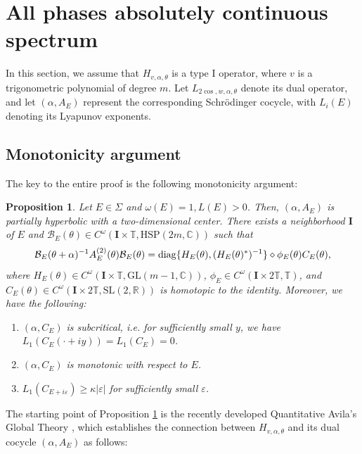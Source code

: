 \documentclass[11pt]{amsart}
\newtheorem{prop}[theorem]{Proposition}
\theoremstyle{remark}
\theoremstyle{definition}
\newcommand{\I}{{\mathbf I}}
\newcommand{\diag}{{\rm diag}}
\begin{document}
\section{All phases absolutely continuous spectrum}\label{all}
In this section, we assume that $ H_{v,\alpha,\theta} $ is a type I operator, where $ v $ is a trigonometric polynomial of degree $ m $. Let $ L_{2\cos,w,\alpha,\theta} $ denote its dual operator, and let $ (\alpha,A_E) $ represent the corresponding Schr\"odinger cocycle, with $ {L}_i(E) $ denoting its Lyapunov exponents.

\subsection{Monotonicity argument}

The key to the entire proof is the following monotonicity argument:

\begin{prop} \label{cr} Let $ E \in \Sigma $ and $ \omega(E) = 1, L(E) > 0 $. Then, $ (\alpha, A_E) $ is partially hyperbolic with a two-dimensional center. There exists a neighborhood $ \I $ of $ E $ and $ \mathcal{B}_E(\theta) \in C^\omega(\I \times \mathbb{T}, \mathrm{HSP}(2m, \mathbb{C})) $ such that \begin{equation}\label{aaa18}
\mathcal{B}_E(\theta + \alpha)^{-1} A_E^{(2)}(\theta) \mathcal{B}_E(\theta) = \diag\{H_E(\theta), (H_E(\theta)^*)^{-1}\} \diamond \phi_E(\theta) C_E(\theta),
\end{equation} where $ H_E(\theta) \in C^\omega(\I \times \mathbb{T}, \mathrm{GL}(m-1, \mathbb{C})) $, $ \phi_E \in C^\omega(\I \times 2\mathbb{T}, \mathbb{T}) $, and $ C_E(\theta) \in C^{\omega}(\I\times 2\mathbb{T}, \mathrm{SL}(2, \mathbb{R})) $ is homotopic to the identity. Moreover, we have the following:
\begin{enumerate}
\item $(\alpha, C_E)$ is subcritical, i.e. for sufficiently small \( y \), we have   \( L_1(C_E(\cdot + iy)) = L_1(C_E) = 0 \). 
\item $(\alpha, C_E)$ is monotonic with respect to \( E \).
\item \( L_1(C_{E + i\varepsilon}) \geq \kappa |\varepsilon| \) for sufficiently small \( \varepsilon \).
\end{enumerate} \end{prop}

The starting point of Proposition \ref{cr} is the recently developed Quantitative Avila's Global Theory \cite{GJYZ}, which establishes the connection between $ H_{v,\alpha,\theta} $ and its dual cocycle $(\alpha, A_E)$ as follows:
\end{document}
